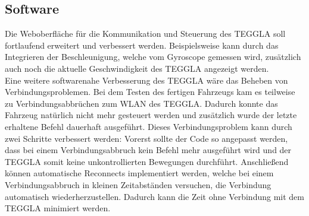 \subsection{Software}

Die Weboberfläche für die Kommunikation und Steuerung des TEGGLA soll fortlaufend erweitert und verbessert werden. 
Beispielsweise kann durch das Integrieren der Beschleunigung, welche vom Gyroscope gemessen wird, zusätzlich auch noch die aktuelle Geschwindigkeit des TEGGLA angezeigt werden.\\

Eine weitere softwarenahe Verbesserung des TEGGLA wäre das Beheben von Verbindungsproblemen. 
Bei dem Testen des fertigen Fahrzeugs kam es teilweise zu Verbindungsabbrüchen zum WLAN des TEGGLA. 
Dadurch konnte das Fahrzeug natürlich nicht mehr gesteuert werden und zusätzlich wurde der letzte erhaltene Befehl dauerhaft ausgeführt. 
Dieses Verbindungsproblem kann durch zwei Schritte verbessert werden: Vorerst sollte der Code so angepasst werden, dass bei einem Verbindungsabbruch kein Befehl mehr ausgeführt wird und der TEGGLA somit keine unkontrollierten Bewegungen durchführt. 
Anschließend können automatische Reconnects implementiert werden, welche bei einem Verbindungsabbruch in kleinen Zeitabständen versuchen, die Verbindung automatisch wiederherzustellen. 
Dadurch kann die Zeit ohne Verbindung mit dem TEGGLA minimiert werden.
